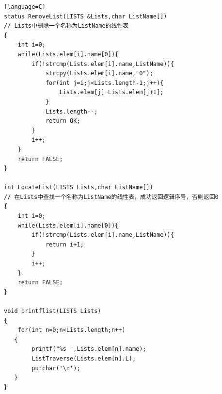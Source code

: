 \documentclass[supercite]{Experimental_Report}
\theoremstyle{definition}
\begin{document}
\begin{sloppypar}
\begin{lstlisting}[breaklines][language=C]
status RemoveList(LISTS &Lists,char ListName[])
// Lists中删除一个名称为ListName的线性表
{
    int i=0;
    while(Lists.elem[i].name[0]){
        if(!strcmp(Lists.elem[i].name,ListName)){
        	strcpy(Lists.elem[i].name,"0");
            for(int j=i;j<Lists.length-1;j++){
                Lists.elem[j]=Lists.elem[j+1];
            }
            Lists.length--;
            return OK;
        }
        i++;
    }
    return FALSE;
}

int LocateList(LISTS Lists,char ListName[])
// 在Lists中查找一个名称为ListName的线性表，成功返回逻辑序号，否则返回0
{
    int i=0;
    while(Lists.elem[i].name[0]){
        if(!strcmp(Lists.elem[i].name,ListName)){
            return i+1;
        }
        i++;
    }
    return FALSE;
}

void printflist(LISTS Lists)
{
	for(int n=0;n<Lists.length;n++)
   {
   		printf("%s ",Lists.elem[n].name);
   		ListTraverse(Lists.elem[n].L);
        putchar('\n');
   }
}


\end{lstlisting}
\end{sloppypar}
\end{document}
